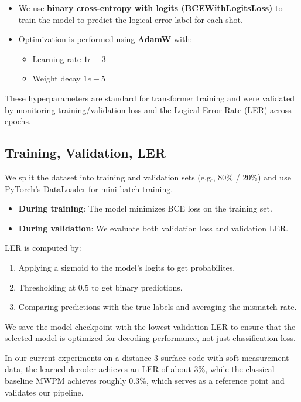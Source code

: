 \documentclass[12pt]{article}
\begin{document}
\begin{itemize}
    \item We use \textbf{binary cross-entropy with logits (BCEWithLogitsLoss)} to train the model to predict the logical error label for each shot.
    \item Optimization is performed using \textbf{AdamW} with:
    \begin{itemize}
        \item Learning rate $1e-3$
        \item Weight decay $1e-5$
    \end{itemize}
\end{itemize}

These hyperparameters are standard for transformer training and were validated by monitoring training/validation loss and the Logical Error Rate (LER) across epochs.

\subsection*{Training, Validation, LER}

We split the dataset into training and validation sets (e.g., 80\% / 20\%) and use PyTorch's DataLoader for mini-batch training.

\begin{itemize}
    \item \textbf{During training}: The model minimizes BCE loss on the training set.
    \item \textbf{During validation}: We evaluate both validation loss and validation LER.
\end{itemize}

LER is computed by:

\begin{enumerate}
    \item Applying a sigmoid to the model's logits to get probabilites.
    \item Thresholding at 0.5 to get binary predictions.
    \item Comparing predictions with the true labels and averaging the mismatch rate.
\end{enumerate}

We save the model-checkpoint with the lowest validation LER to ensure that the selected model is optimized for decoding performance, not just classification loss.

In our current experiments on a distance-3 surface code with soft measurement data, the learned decoder achieves an LER of about 3\%, 
while the classical baseline MWPM achieves roughly 0.3\%, which serves as a reference point and validates our pipeline.
\end{document}

